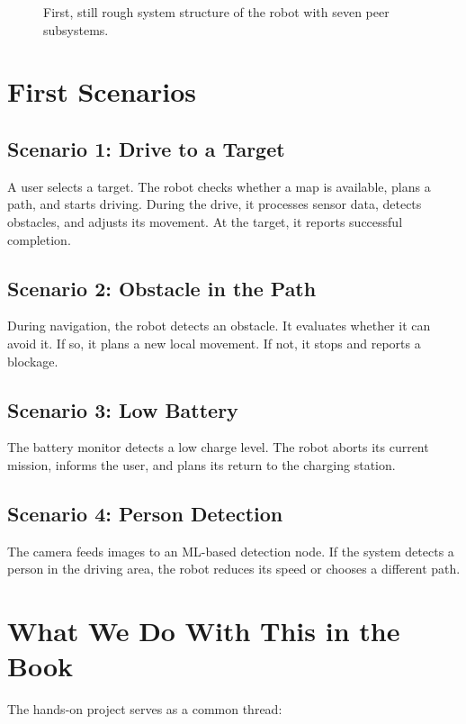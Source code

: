\begin{figure}[H]
  \centering
  \caption{First, still rough system structure of the robot with seven peer subsystems.}
  \label{fig:kap05-systemstruktur-uebersicht}
\end{figure}

\section{First Scenarios}
\subsection{Scenario 1: Drive to a Target}
A user selects a target. The robot checks whether a map is available, plans a path, and starts driving. During the drive, it processes sensor data, detects obstacles, and adjusts its movement. At the target, it reports successful completion.

\subsection{Scenario 2: Obstacle in the Path}
During navigation, the robot detects an obstacle. It evaluates whether it can avoid it. If so, it plans a new local movement. If not, it stops and reports a blockage.

\subsection{Scenario 3: Low Battery}
The battery monitor detects a low charge level. The robot aborts its current mission, informs the user, and plans its return to the charging station.

\subsection{Scenario 4: Person Detection}
The camera feeds images to an ML-based detection node. If the system detects a person in the driving area, the robot reduces its speed or chooses a different path.

\section{What We Do With This in the Book}
The hands-on project serves as a common thread:

